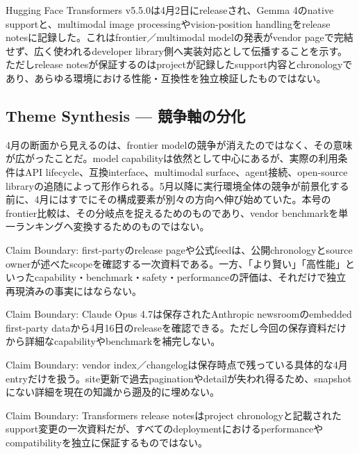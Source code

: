 Hugging Face Transformers v5.5.0は4月2日にreleaseされ、Gemma 4のnative supportと、multimodal image processingやvision-position handlingをrelease notesに記録した。これはfrontier／multimodal modelの発表がvendor pageで完結せず、広く使われるdeveloper library側へ実装対応として伝播することを示す。ただしrelease notesが保証するのはprojectが記録したsupport内容とchronologyであり、あらゆる環境における性能・互換性を独立検証したものではない。\autocite{src-6ddeedd7665f}


\subsection{Theme Synthesis — 競争軸の分化}

4月の断面から見えるのは、frontier modelの競争が消えたのではなく、その意味が広がったことだ。model capabilityは依然として中心にあるが、実際の利用条件はAPI lifecycle、互換interface、multimodal surface、agent接続、open-source libraryの追随によって形作られる。5月以降に実行環境全体の競争が前景化する前に、4月にはすでにその構成要素が別々の方向へ伸び始めていた。本号のfrontier比較は、その分岐点を捉えるためのものであり、vendor benchmarkを単一ランキングへ変換するためのものではない。\autocite{src-6ddeedd7665f,src-9156c37fb1c2,src-a24fd97eb3d0,src-dfe7e0c6ff39,src-e547d0d8cbe3,src-eac8dfbeb78c}


\begin{claimboundary}
Claim Boundary: first-partyのrelease pageや公式feedは、公開chronologyとsource ownerが述べたscopeを確認する一次資料である。一方、「より賢い」「高性能」といったcapability・benchmark・safety・performanceの評価は、それだけで独立再現済みの事実にはならない。\autocite{src-a07eb39dec04,src-dfe7e0c6ff39}
\end{claimboundary}

\begin{claimboundary}
Claim Boundary: Claude Opus 4.7は保存されたAnthropic newsroomのembedded first-party dataから4月16日のreleaseを確認できる。ただし今回の保存資料だけから詳細なcapabilityやbenchmarkを補完しない。\autocite{src-f6aa679babd7}
\end{claimboundary}

\begin{claimboundary}
Claim Boundary: vendor index／changelogは保存時点で残っている具体的な4月entryだけを扱う。site更新で過去paginationやdetailが失われ得るため、snapshotにない詳細を現在の知識から遡及的に埋めない。\autocite{src-9156c37fb1c2,src-a24fd97eb3d0,src-e547d0d8cbe3,src-eac8dfbeb78c}
\end{claimboundary}

\begin{claimboundary}
Claim Boundary: Transformers release notesはproject chronologyと記載されたsupport変更の一次資料だが、すべてのdeploymentにおけるperformanceやcompatibilityを独立に保証するものではない。\autocite{src-6ddeedd7665f}
\end{claimboundary}
